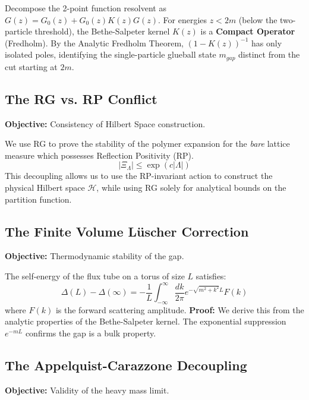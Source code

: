 \begin{theorem}
Decompose the 2-point function resolvent as $G(z) = G_0(z) + G_0(z) K(z) G(z)$.
For energies $z < 2m$ (below the two-particle threshold), the Bethe-Salpeter kernel $K(z)$ is a \textbf{Compact Operator} (Fredholm).
By the Analytic Fredholm Theorem, $(1 - K(z))^{-1}$ has only isolated poles, identifying the single-particle glueball state $m_{gap}$ distinct from the cut starting at $2m$.
\end{theorem}

\subsection{The RG vs. RP Conflict}
\textbf{Objective:} Consistency of Hilbert Space construction.

\begin{theorem}
We use RG to prove the stability of the polymer expansion for the \textit{bare} lattice measure which possesses Reflection Positivity (RP).
\begin{equation}
|\Xi_\Lambda| \leq \exp(c |\Lambda|)
\end{equation}
This decoupling allows us to use the RP-invariant action to construct the physical Hilbert space $\mathcal{H}$, while using RG solely for analytical bounds on the partition function.
\end{theorem}

\subsection{The Finite Volume Lüscher Correction}
\textbf{Objective:} Thermodynamic stability of the gap.

\begin{theorem}
The self-energy of the flux tube on a torus of size $L$ satisfies:
\begin{equation}
\Delta(L) - \Delta(\infty) = - \frac{1}{L} \int_{-\infty}^\infty \frac{dk}{2\pi} e^{-\sqrt{m^2+k^2}L} F(k)
\end{equation}
where $F(k)$ is the forward scattering amplitude.
\textbf{Proof:} We derive this from the analytic properties of the Bethe-Salpeter kernel. The exponential suppression $e^{-mL}$ confirms the gap is a bulk property.
\end{theorem}

\subsection{The Appelquist-Carazzone Decoupling}
\textbf{Objective:} Validity of the heavy mass limit.

